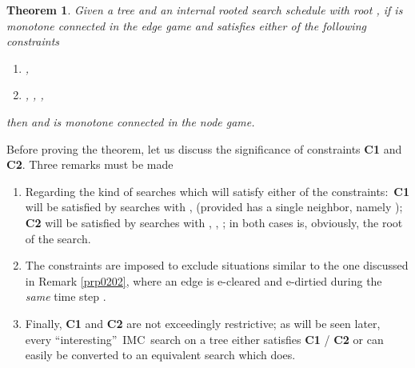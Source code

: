 \documentclass[11pt]{article}\usepackage{amsmath}
\newtheorem{theorem}{Theorem}[section]
\begin{document}
\begin{theorem}
\label{prp0402}Given a tree  and an internal \emph{rooted }search
schedule  with root , if  is monotone connected
\emph{in the edge game} and satisfies either of the following constraints

\begin{enumerate}
\item[\textbf{C1}] , 

\item[\textbf{C2}] , , ,
\end{enumerate}

then
and  is monotone connected in the node game.
\end{theorem}

\begin{remark}
\label{prp0403}Before proving the theorem, let us discuss the significance of
constraints \textbf{C1} and \textbf{C2}. Three remarks must be made

\begin{enumerate}
\item Regarding the kind of searches which will satisfy either of the
constraints:\ \textbf{C1} will be satisfied by searches with ,  (provided  has a single neighbor, namely );
\textbf{C2} will be satisfied by searches with , ,
; in both cases  is,
obviously, the root of the search.

\item The constraints are imposed to exclude situations similar to the one
discussed in Remark \ref{prp0202}, where an edge is e-cleared and e-dirtied
during the \emph{same }time step .

\item Finally, \textbf{C1} and \textbf{C2} are not exceedingly restrictive; as
will be seen later, every \textquotedblleft interesting\textquotedblright \ IMC\ search on a tree either satisfies \textbf{C1} / \textbf{C2} or can
easily be converted to an equivalent search which does.
\end{enumerate}
\end{remark}
\end{document}
